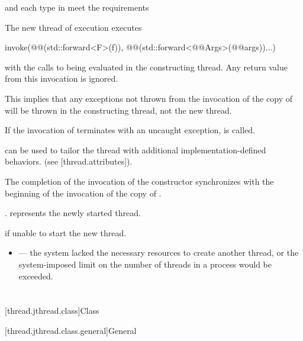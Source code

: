 \documentclass{wg21}
\begin{document}
\begin{itemdescr}
\pnum
\expects
{} and each type in  meet the
 requirements

\pnum
\effects
The new thread of execution executes
\begin{codeblock}
    invoke(@@(std::forward<F>(f)), @@(std::forward<@@Args>(@@args))...)
\end{codeblock}
with the calls to
 being evaluated in the constructing thread.
Any return value from this invocation is ignored.
\begin{note}
    This implies that any exceptions not thrown from the invocation of the copy
    of  will be thrown in the constructing thread, not the new thread.
\end{note}
If the invocation of  terminates with an uncaught exception,
 is called.

\begin{addedblock}
 can be used to tailor the thread with additional implementation-defined behaviors. (see [thread.attributes]).
\end{addedblock}

\pnum
\sync
The completion of the invocation of the constructor
synchronizes with the beginning of the invocation of the copy of .

\pnum
\ensures
{}.  represents the newly started thread.

\pnum
\throws
{} if unable to start the new thread.

\pnum
\errors
\begin{itemize}
    \item {} --- the system lacked the necessary
    resources to create another thread, or the system-imposed limit on the number of
    threads in a process would be exceeded.
\end{itemize}
\end{itemdescr}

\section{}

[thread.jthread.class]{Class }

[thread.jthread.class.general]{General}
\end{document}
